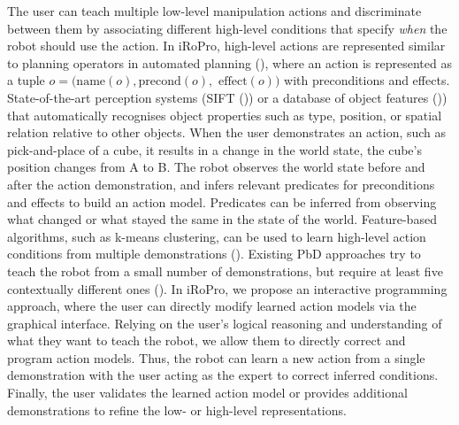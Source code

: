 The user can teach multiple low-level manipulation actions and discriminate between them by associating different high-level conditions that specify \textit{when} the robot should use the action.%
In iRoPro, high-level actions are represented similar to planning operators in automated planning (), where an action is represented as a tuple $o = (\text{name}(o), \text{precond}(o),$ $\text{effect}(o))$ with preconditions and effects.
State-of-the-art perception systems (\eg SIFT (\cite{ahmadzadeh2015learning})) or a database of object features (\cite{mason2011robot})) that automatically recognises object properties such as type, position, or spatial relation relative to other objects.
When the user demonstrates an action, such as pick-and-place of a cube, %
it results in a change in the world state, \eg the cube's position changes from A to B.
The robot observes the world state before and after the action demonstration, and infers relevant predicates for preconditions and effects to build an action model. %
Predicates can be inferred from observing what changed or what stayed the same in the state of the world.
Feature-based algorithms, such as k-means clustering, can be used to learn high-level action conditions from multiple demonstrations (\cite{mollard2015robot,abdo2013learning}).
Existing PbD approaches try to teach the robot from a small number of demonstrations, but require at least five contextually different ones (\cite{orendt2016robot,abdo2013learning}).
In iRoPro, we propose an interactive programming approach, where the user can directly modify learned action models via the graphical interface.
Relying on the user's logical reasoning and understanding of what they want to teach the robot, we allow them to directly correct and program action models.
Thus, the robot can learn a new action from a single demonstration with the user acting as the expert to correct inferred conditions.
Finally, the user validates the learned action model or provides additional demonstrations to refine the low- or high-level representations.

